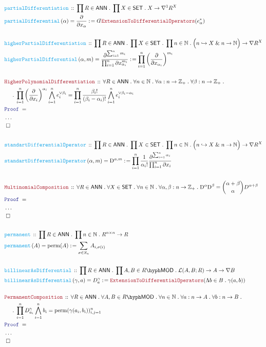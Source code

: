 \documentclass[12pt]{scrartcl}%
\newcommand{\FUNC}[1]{\textcolor{Cerulean}{\mathtt{#1}}}%
\newcommand{\LOGIC}[1]{\textcolor{Blue}{\mathtt{#1}}}%
\newcommand{\THM}[1]{\textcolor{Maroon}{\mathtt{#1}}}%
\renewcommand{\.}{\; . \;} %
\newcommand{\de}{: \kern 0.1pc =} %
\newcommand{\Act}[1]{\left( #1 \right)} %
\newcommand{\Theorem}[2]{& \THM{#1} \, :: \, #2 \\ & \Proof = \\ } %
\newcommand{\DeclareFunc}[2]{& \FUNC{#1} \, :: \, #2 \\}%
\newcommand{\DefineNamedFunc}[4]{&  \FUNC{#1}\Act{#2} = #3 \de #4 \\}%
\newcommand{\NewLine}{\\ & \kern 1pc}%
\newcommand{\Page}[1]{ \begin{align*} #1 \end{align*}  }%
\newcommand{ \bd }{ \ByDef }%
\newcommand{\NoProof}{ & \ldots \\ \EndProof}%
\renewcommand{\And}{\; \& \;}%
\newcommand{\Int}{\mathbb{Z}}%
\newcommand{\Nat}{\mathbb{N}}%
\newcommand{\ToInj}{\hookrightarrow} %
\newcommand{\QED}{\; \square} %
\newcommand{\EndProof}{& \QED \\} %
\newcommand{\ByDef}{\rotatebox[origin=c]{-180}{$D$}}%
\newcommand{\Proof}{\LOGIC{Proof} \; } %
\newcommand{\SET}{\mathsf{SET}} %
\DeclareMathOperator{\perm}{perm} %
\newcommand{\LMOD}[1]{#1\hyph\mathsf{MOD}} %
\renewcommand{\L}{\mathcal{L}}
\newcommand{\ANN}{\mathsf{ANN}} %
\begin{document}
\Page{
	\DeclareFunc{partialDifferentiation}{\prod R \in \ANN \. \prod X \in \SET \. X \to \nabla^1 R^X}
	\DefineNamedFunc{partialDifferential}{\alpha}{\frac{\partial}{\partial x_\alpha}}{ \bd \THM{ExtensionToDifferentialOperators}(e_\alpha^*)}
	\\
	\DeclareFunc{higherPartialDifferentiation}{\prod R \in \ANN \. \prod X \in \SET \. \prod n \in \Nat \. \Big(n \ToInj X \And n \to \Nat\Big) \to \nabla R^X }
	\DefineNamedFunc{higherPartialDifferential}
	{ \alpha,m  }{  \frac{\partial^{\sum^n_{i=1}m_i}}{\prod^n_{i=1} \partial x_{\alpha_i}^{m_i}} }
	{\prod^n_{i=1} \left( \frac{\partial}{\partial x_{\alpha_i} } \right)^{m_i}  }
	\\
	\Theorem{HigherPolynomialDifferentiation}{\forall R \in \ANN \. \forall n \in \Nat \. \forall \alpha : n \to \Int_+ \. \forall \beta : n \to \Int_+ \.  
		\NewLine \.  
		\prod^n_{i=1} \left( \frac{\partial}{\partial x_i} \right)^{\alpha_i} \bigwedge^n_{i=1} e_i^{\vee \beta_i} = \prod^n_{i=1} \frac{\beta_i!}{(\beta_i - \alpha_i)!} \bigwedge^n_{i=1} e_i^{\vee \beta_i-\alpha_i}  
	}
	\NoProof
	\\
	\DeclareFunc{standartDifferentialOperator}{\prod R \in \ANN \. \prod X \in \SET \. \prod n \in \Nat \. \Big(n \ToInj X \And n \to \Nat\Big) \to \nabla R^X }
	\DefineNamedFunc{standartDifferentialOperator}
	{ \alpha,m  }{  \mathrm{D}^{\alpha,m} }
	{  \prod^n_{i=1} \frac{1}{\alpha_i!} \frac{\partial^{\sum^n_{i=1} \alpha_i}}{\prod^n_{i=1}\partial x_i}  }
	\\
	\Theorem{MultinomialComposition}
	{
		\forall R \in \ANN \.
		\forall X \in \SET \.
		\forall n \in \Nat \.
		\forall \alpha,\beta : n \to  \Int_+ \.
		\mathrm{D}^\alpha \mathrm{D}^\beta = \binom{\alpha + \beta}{\alpha} D^{\alpha + \beta} 
	}
	\NoProof
	\\
	\DeclareFunc{permanent}
	{
	    \prod R \in \ANN \. 
	    \prod n \in \Nat \.
	    R^{n \times n} \to R
	}
	\DefineNamedFunc
	{permanent}{A}{\perm(A)}{ \sum_{\sigma \in S_n} A_{i,\sigma(i)}}
	\\
	\DeclareFunc{billinearAsDifferential}
	{
	    \prod R \in \ANN \. 
	    \prod A,B \in \LMOD{R} \.
	    \L(A,B;R) \to A \to \nabla B
	}
	\DefineNamedFunc
	{billinearAsDifferential}{\gamma, a}{D^\gamma_a}{  \THM{ExtensionToDifferentialOperators}(\Lambda b \in B \. \gamma(a,b))  }
	\\
	\Theorem{PermanentComposition}
	{
		\forall R \in \ANN \.
		\forall A,B \in \LMOD{R} \. 
		\forall n \in \Nat \. 
		\forall a : n \to A \.
		\forall b : n \to B \. \NewLine \. 
		\prod^n_{i=1} D^\gamma_{a_i} \bigwedge^n_{i=1} b_i = \perm ( \gamma(a_i,b_i))^n_{i,j=1}
	}
	\NoProof
}
\newpage
\end{document}
